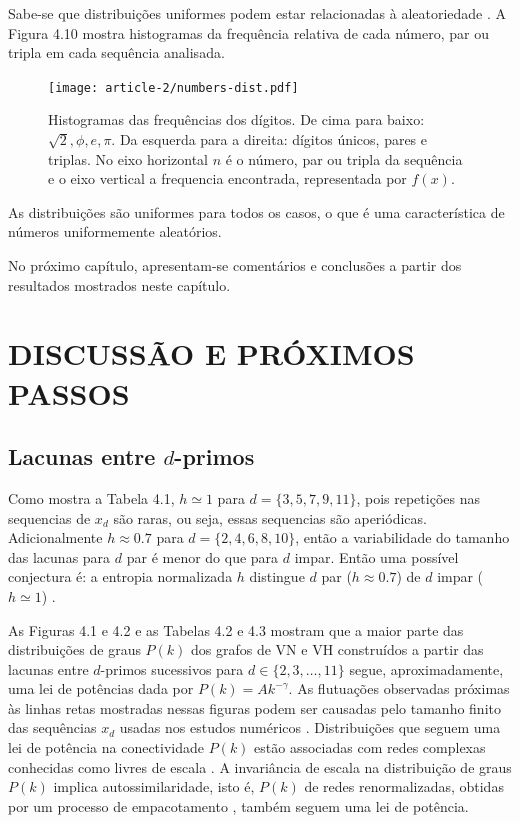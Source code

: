 \documentclass[12pt,a4paper,fleqn]{report}
\begin{document}
Sabe-se que distribuições uniformes podem estar relacionadas à aleatoriedade \cite{avigad_2013}. A Figura 4.10 mostra histogramas da frequência relativa de cada número, par ou tripla em cada sequência analisada.

\begin{figure}[H]
    \centering
    \texttt{[image: article-2/numbers-dist.pdf]}
    \caption{Histogramas das frequências dos dígitos. De cima para baixo: 
    $\sqrt{2}, \phi, e, \pi$. Da esquerda para a direita: dígitos únicos, pares e triplas.
    No eixo horizontal $n$ é o número, par ou tripla da sequência e o eixo vertical a 
    frequencia encontrada, representada por $f(x)$.}
    \label{histograms}
\end{figure}

As distribuições são uniformes para todos os casos, o que é uma característica
de números uniformemente aleatórios.

No próximo capítulo, apresentam-se comentários e conclusões a partir dos resultados mostrados neste capítulo.


\chapter{DISCUSSÃO E PRÓXIMOS PASSOS}





\section{Lacunas entre $d$-primos}

Como mostra a Tabela 4.1, $h \simeq 1$ para
$d=\{3,5,7,9,11\}$, pois repetições nas sequencias de $x_d$ são
 raras, ou seja, essas sequencias são aperiódicas.
Adicionalmente $h \approx 0.7$ para $d=\{2,4,6,8,10\}$, 
então a variabilidade do tamanho das lacunas para $d$ par é
menor do que para $d$ impar. Então uma possível conjectura é:
a entropia normalizada $h$ distingue $d$ par ($h \approx 0.7$)
de $d$ impar ($h\simeq 1$) \cite{me_2020}.

As Figuras 4.1 e 4.2 e as Tabelas
4.2 e 4.3 mostram que a maior parte
das distribuições de graus $P(k)$ dos grafos de VN e VH construídos a partir
das lacunas entre $d$-primos sucessivos para $d \in \{2, 3, \ldots, 11\}$
segue, aproximadamente, uma lei de potências dada por $P(k)=A k^{-\gamma}$.
As flutuações observadas próximas às linhas retas mostradas nessas figuras
podem ser causadas pelo tamanho finito das sequências $x_d$ usadas nos
estudos numéricos \cite{li2}.  Distribuições que seguem uma lei de potência
na conectividade $P(k)$ estão associadas com redes complexas conhecidas como
livres de escala \cite{li2,a81,a83}. A invariância de escala na distribuição
de graus $P(k)$ implica autossimilaridade, isto é, $P(k)$ de redes renormalizadas,
obtidas por um processo de empacotamento \cite{a400}, também seguem uma lei
de potência.
\end{document}
